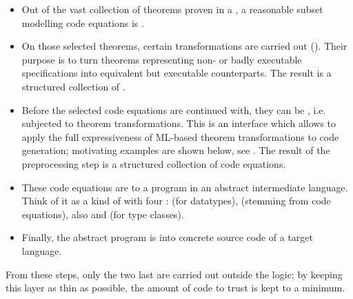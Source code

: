 \begin{isabellebody}
\begin{isamarkuptext}
\begin{itemize}
    \item Out of the vast collection of theorems proven in a
      , a reasonable subset modelling
      code equations is .

    \item On those selected theorems, certain
      transformations are carried out
      ().  Their purpose is to turn theorems
      representing non- or badly executable
      specifications into equivalent but executable counterparts.
      The result is a structured collection of .

    \item Before the selected code equations are continued with,
      they can be , i.e. subjected to theorem
      transformations.  This  is an interface which
      allows to apply
      the full expressiveness of ML-based theorem transformations
      to code generation;  motivating examples are shown below, see
      .
      The result of the preprocessing step is a structured collection
      of code equations.

    \item These code equations are  to a program
      in an abstract intermediate language.  Think of it as a kind
      of  with four : 
      (for datatypes),  (stemming from code equations),
      also  and  (for type classes).

    \item Finally, the abstract program is  into concrete
      source code of a target language.

  \end{itemize}

  \noindent From these steps, only the two last are carried out outside the logic;  by
  keeping this layer as thin as possible, the amount of code to trust is
  kept to a minimum.%
\end{isamarkuptext}%
\isamarkuptrue%
%
\isadelimtheory
%
\endisadelimtheory
%
\isatagtheory
{}\isamarkupfalse%
%
\endisatagtheory
{\isafoldtheory}%
%
\isadelimtheory
%
\endisadelimtheory
\isanewline
\end{isabellebody}%
